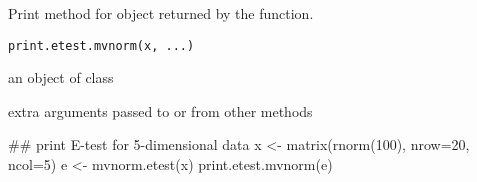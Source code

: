 \begin{Description}\relax
Print method for  object returned by the 
 function.
\end{Description}
\begin{Usage}
\begin{verbatim}
print.etest.mvnorm(x, ...)
\end{verbatim}
\end{Usage}
\begin{Arguments}
\begin{ldescription}
\item[\code{x}] an object of class  
\item[\code{...}] extra arguments passed to or from other methods 
\end{ldescription}
\end{Arguments}
\begin{SeeAlso}\relax
{}
\end{SeeAlso}
\begin{Examples}
\begin{ExampleCode}
 ## print E-test for 5-dimensional data
 x <- matrix(rnorm(100), nrow=20, ncol=5)
 e <- mvnorm.etest(x)
 print.etest.mvnorm(e)
 \end{ExampleCode}
\end{Examples}

